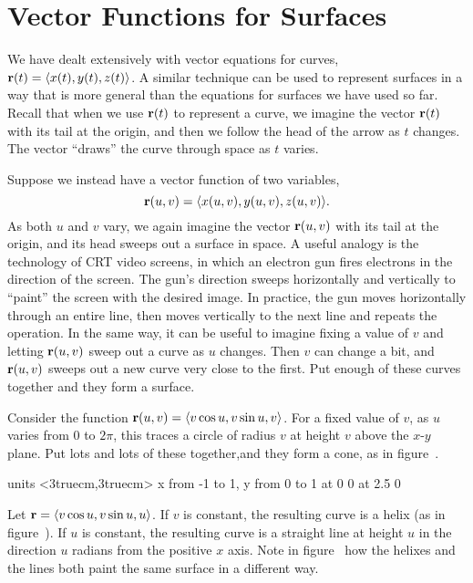 \section{Vector Functions for Surfaces}{}{}

We have dealt extensively with vector equations for curves, 
${\bf r}(t)=\langle x(t),y(t),z(t)\rangle$. A similar technique
can be used to represent surfaces in a way that is more general than
the equations for surfaces we have used so far. Recall that
when we use ${\bf r}(t)$ to represent a curve, we imagine the vector 
${\bf r}(t)$ with its tail at the origin, and then we follow the head
of the arrow as $t$ changes. The vector ``draws'' the curve through
space as $t$ varies.

Suppose we instead have a vector function of two variables,
$${\bf r}(u,v)=\langle x(u,v),y(u,v),z(u,v)\rangle.$$ As both $u$ and
$v$ vary, we again imagine the vector ${\bf r}(u,v)$ with its tail at
the origin, and its head sweeps out a surface in space. A useful
analogy is the technology of CRT video screens, in which an electron
gun fires electrons in the direction of the screen. The gun's
direction sweeps horizontally and vertically to ``paint'' the screen
with the desired image. In practice, the gun moves horizontally
through an entire line, then moves vertically to the next line and
repeats the operation. In the same way, it can be useful to imagine
fixing a value of $v$ and letting ${\bf r}(u,v)$ sweep out a curve as
$u$ changes. Then $v$ can change a bit, and ${\bf r}(u,v)$ sweeps out
a new curve very close to the first. Put enough of these curves
together and they form a surface.

\begin{example} Consider the function ${\bf r}(u,v)=\langle v\cos u,v\sin u,
v\rangle$.  For a fixed value of $v$, as $u$ varies from 0 to $2\pi$,
this traces a circle of radius $v$ at height $v$ above the
$x$-$y$ plane. Put lots and lots of these together,and they form a
cone, as in figure~.
\end{example}

\figure
\vbox{\beginpicture
\normalgraphs
\ninepoint
\setcoordinatesystem units <3truecm,3truecm>
\setplotarea x from -1 to 1, y from 0 to 1
 at 0 0
 at 2.5 0
\endpicture}

\begin{example} Let ${\bf r}=\langle v\cos u, v\sin u, u\rangle$. If $v$ is
constant, the resulting curve is a helix (as in
figure~). If $u$ is constant, the resulting curve
is a straight line at height $u$ in the direction $u$ radians from the
positive $x$ axis. Note in figure~ how the
helixes and the lines both paint the same surface in a different way.
\end{example}

